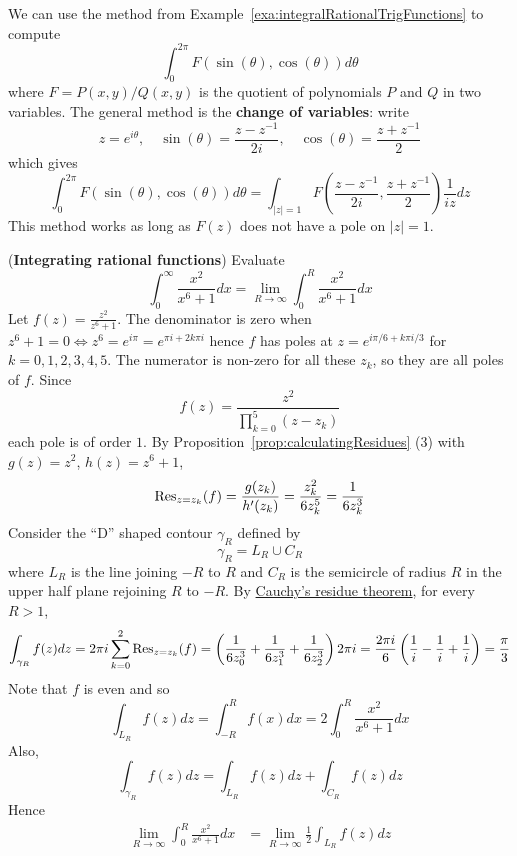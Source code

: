 \begin{remark}
	We can use the method from Example~\ref{exa:integralRationalTrigFunctions} to compute
	\[
		\int_{0}^{2\pi} F(\sin(\theta), \cos(\theta)) d\theta
	\]
	where $F = P(x, y) / Q(x, y)$ is the quotient of polynomials $P$ and $Q$ in two variables. The general method is the \textbf{change of variables}: write
	\[
		z = e^{i \theta}, \quad \sin(\theta) = \frac{z - z^{-1}}{2i}, \quad \cos(\theta) = \frac{z + z^{-1}}{2}
	\]
	which gives
	\[
		\int_{0}^{2\pi} F(\sin(\theta), \cos(\theta)) d\theta = \int_{|z| = 1} F \left( \frac{z - z^{-1}}{2i}, \frac{z + z^{-1}}{2} \right) \frac{1}{iz} dz
	\]
	This method works as long as $F(z)$ does not have a pole on $|z| = 1$.
\end{remark}

\begin{example}\label{exa:integratingRationalFunctions}
	(\textbf{Integrating rational functions}) Evaluate
	\[
		\int_{0}^{\infty} \frac{x^2}{x^6 + 1} dx = \lim_{R \to \infty} \int_{0}^{R} \frac{x^2}{x^6 + 1} dx
	\]
	Let $f(z) = \frac{z^2}{z^6 + 1}$. The denominator is zero when $z^6 + 1 = 0 \Longleftrightarrow z^6 = e^{i\pi} = e^{\pi i + 2k\pi i}$ hence $f$ has poles at $z = e^{i\pi / 6 + k\pi i / 3}$ for $k = 0, 1, 2, 3, 4, 5$. The numerator is non-zero for all these $z_k$, so they are all poles of $f$. Since
	\[
		f(z) = \frac{z^2}{\prod_{k = 0}^{5} (z - z_k)}
	\]
	each pole is of order $1$. By Proposition~\ref{prop:calculatingResidues} (3) with $g(z) = z^2$, $h(z) = z^6 + 1$,
	\[
		\text{Res}_{z = z_k}(f) = \frac{g(z_k)}{h'(z_k)} = \frac{z_k^2}{6 z_k^5} = \frac{1}{6 z_k^3}
	\]
	Consider the ``D'' shaped contour $\gamma_R$ defined by
	\[
		\gamma_R = L_R \cup C_R
	\]
	where $L_R$ is the line joining $-R$ to $R$ and $C_R$ is the semicircle of radius $R$ in the upper half plane rejoining $R$ to $-R$. By \hyperref[thm:cauchysResidueTheorem]{Cauchy's residue theorem}, for every $R > 1$,
	\[
		\int_{\gamma_R} f(z) dz = 2 \pi i \sum_{k = 0}^2 \text{Res}_{z = z_k}(f) = \left( \frac{1}{6 z_0^3} + \frac{1}{6 z_1^3} + \frac{1}{6 z_2^3} \right) 2 \pi i = \frac{2 \pi i}{6} \left( \frac{1}{i} - \frac{1}{i} + \frac{1}{i} \right) = \frac{\pi}{3}
	\]
	Note that $f$ is even and so
	\[
		\int_{L_R} f(z) dz = \int_{-R}^{R} f(x) dx = 2 \int_{0}^{R} \frac{x^2}{x^6 + 1} dx
	\]
	Also,
	\[
		\int_{\gamma_R} f(z) dz = \int_{L_R} f(z) dz + \int_{C_R} f(z) dz
	\]
	Hence
	\[
		\begin{aligned}
			\lim_{R \to \infty} \int_{0}^{R} \frac{x^2}{x^6 + 1} dx & = \lim_{R \to \infty} \frac{1}{2} \int_{L_R} f(z) dz \\

\end{aligned}\]
\end{example}
